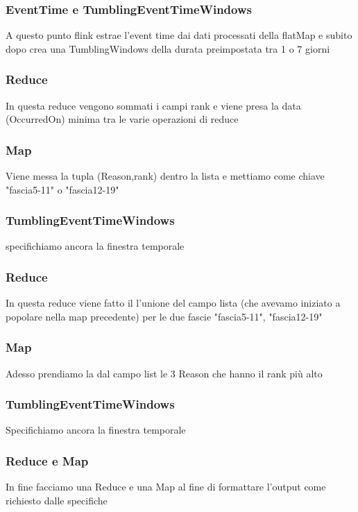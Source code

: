 \documentclass[acmsmall]{acmart}
\begin{document}
\subsubsection{EventTime e TumblingEventTimeWindows}
A questo punto flink estrae l'event time dai dati processati della flatMap e 
subito dopo crea una TumblingWindows della durata preimpostata tra 1 o 7 giorni


\subsubsection{Reduce}
In questa reduce vengono sommati i campi rank e viene presa la data (OccurredOn) minima tra le varie operazioni di reduce 


\subsubsection{Map}
Viene messa la tupla (Reason,rank) dentro la lista e mettiamo come chiave "fascia5-11" o "fascia12-19"

\subsubsection{TumblingEventTimeWindows}
specifichiamo ancora la finestra temporale

\subsubsection{Reduce}
In questa reduce viene fatto il l'unione del campo lista (che avevamo iniziato a popolare nella map precedente) per le due fascie "fascia5-11", "fascia12-19"

\subsubsection{Map}
Adesso prendiamo la dal campo list le 3 Reason che hanno il rank più alto

\subsubsection{TumblingEventTimeWindows}
Specifichiamo ancora la finestra temporale

\subsubsection{Reduce e Map}
In fine facciamo una Reduce e una Map al fine di formattare l'output come richiesto dalle specifiche
\end{document}
